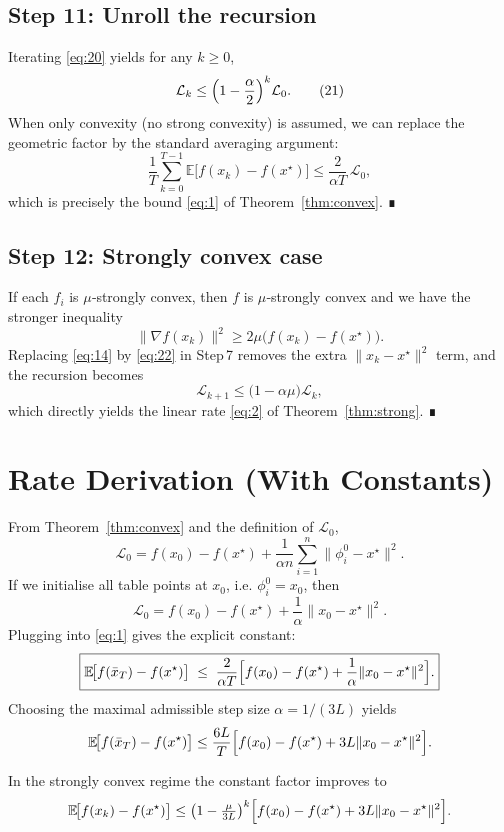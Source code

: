 \documentclass{article}
\begin{document}
\subsection*{Step 11: Unroll the recursion}
Iterating \eqref{eq:20} yields for any $k\ge0$,
\[
\mathcal{L}_{k}\le\Bigl(1-\frac{\alpha}{2}\Bigr)^{k}\mathcal{L}_{0}.
\tag{21}
\]
When only convexity (no strong convexity) is assumed, we can replace the geometric factor by the standard averaging argument:
\[
\frac{1}{T}\sum_{k=0}^{T-1}\mathbb{E}\!\bigl[f(x_k)-f(x^\star)\bigr]
\le\frac{2}{\alpha T}\,\mathcal{L}_{0},
\]
which is precisely the bound \eqref{eq:1} of Theorem~\ref{thm:convex}. ∎

\subsection*{Step 12: Strongly convex case}
If each $f_i$ is $\mu$‑strongly convex, then $f$ is $\mu$‑strongly convex and we have the stronger inequality
\[
\|\nabla f(x_k)\|^{2}\ge 2\mu\bigl(f(x_k)-f(x^\star)\bigr).
\tag{22}
\]
Replacing \eqref{eq:14} by \eqref{eq:22} in Step 7 removes the extra $\|x_k-x^\star\|^{2}$ term, and the recursion becomes
\[
\mathcal{L}_{k+1}\le\bigl(1-\alpha\mu\bigr)\mathcal{L}_{k},
\]
which directly yields the linear rate \eqref{eq:2} of Theorem~\ref{thm:strong}. ∎

\section{Rate Derivation (With Constants)}
From Theorem~\ref{thm:convex} and the definition of $\mathcal{L}_0$,
\[
\mathcal{L}_0 = f(x_0)-f(x^\star)+\frac{1}{\alpha n}\sum_{i=1}^{n}\|\phi_i^{0}-x^\star\|^{2}.
\]
If we initialise all table points at $x_0$, i.e. $\phi_i^{0}=x_0$, then
\[
\mathcal{L}_0 = f(x_0)-f(x^\star)+\frac{1}{\alpha}\|x_0-x^\star\|^{2}.
\]
Plugging into \eqref{eq:1} gives the explicit constant:
\[
\boxed{
\mathbb{E}\!\bigl[f(\bar x_T)-f(x^\star)\bigr]
\;\le\;
\frac{2}{\alpha T}\Bigl[f(x_0)-f(x^\star)+\frac{1}{\alpha}\|x_0-x^\star\|^{2}\Bigr].
}
\]
Choosing the maximal admissible step size $\alpha=1/(3L)$ yields
\[
\mathbb{E}\!\bigl[f(\bar x_T)-f(x^\star)\bigr]
\le \frac{6L}{T}
\Bigl[f(x_0)-f(x^\star)+3L\|x_0-x^\star\|^{2}\Bigr].
\]

In the strongly convex regime the constant factor improves to
\[
\mathbb{E}\!\bigl[f(x_k)-f(x^\star)\bigr]
\le\bigl(1-\tfrac{\mu}{3L}\bigr)^{k}
\Bigl[f(x_0)-f(x^\star)+3L\|x_0-x^\star\|^{2}\Bigr].
\]
\end{document}
